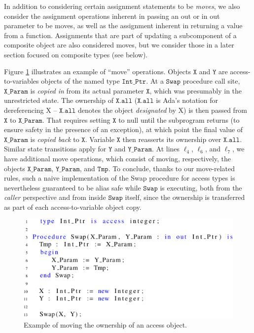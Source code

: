\documentclass{llncs}
\newcommand\var[1]{\ensuremath{\mathtt{#1}}}
\newcommand{\keyword}[1]{\textsf{#1}}
\begin{document}
\smallskip
In addition to considering certain assignment statements to be \textit{moves}, we also consider the assignment
operations inherent in passing an \keyword{out} or \keyword{in out} parameter to be moves, as well
as the assignment inherent in returning a value from a function.
Assignments that are part of updating a subcomponent of a composite object are also considered moves, but
we consider those in a later section focused on composite types (see below).

\smallskip
Figure \ref{fig:move_ex1} illustrates an example of ``move'' operations. Objects \var{X} and \var{Y} are access-to-variables objects of the named type \var{Int\_Ptr}. At a \var{Swap} procedure call site,
\var{X\_Param} is \textit{copied in} from its actual parameter \var{X}, which was presumably in the unrestricted state. The ownership of \var{X.all} (\var{X.all} is Ada's notation for dereferencing X -- \var{X.all} denotes the object \textit{designated} by X) is then passed from \var{X} to \var{X\_Param}.
That requires setting \var{X} to null until the subprogram returns (to ensure safety in the presence of an exception), at which point the final value of \var{X\_Param} is \textit{copied back} to \var{X}.
Variable \var{X} then reasserts its ownership over \var{X.all}. Similar state transitions apply for \var{Y} and \var{Y\_Param}.  At lines $\ell_4$, $\ell_6$, and $\ell_7$,
we have additional move operations, which consist of moving, respectively, the objects \var{X\_Param}, \var{Y\_Param}, and \var{Tmp}. To conclude, thanks to our move-related rules, such a naive
implementation of the Swap procedure for access types is nevertheless guaranteed to be alias safe while \var{Swap} is executing, both from the \textit{caller} perspective and from inside \var{Swap} itself, since the ownership is transferred
as part of each access-to-variable object copy. 

\begin{figure}[htb!]
\centering
   \includegraphics[]{move_ex1}
   \caption{Example of moving the ownership of an access object.}
   \label{fig:move_ex1}
\end{figure}
 
\end{document}
